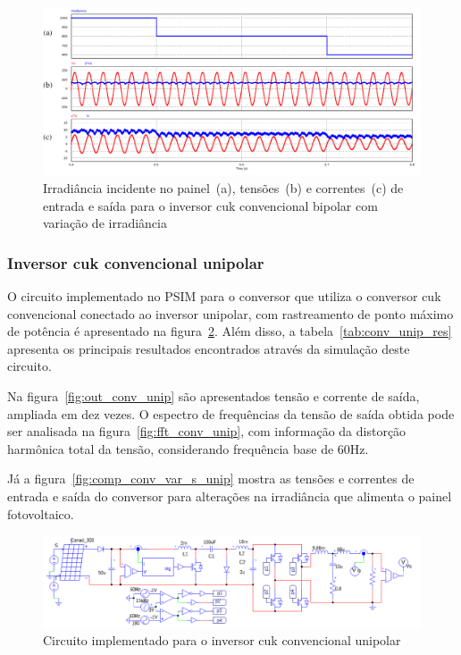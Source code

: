 \documentclass[
	12pt,				%
	openright,			%
	twoside,			%
	a4paper,			%
	english,			%
	french,				%
	spanish,			%
	brazil,				%
	]{abntex2}
\begin{document}
\begin{figure}[H]%
	\captionsetup{justification=centering}
	\centering
		\includegraphics[width= \linewidth]{comp_conv_var_s}
		\caption{Irradiância incidente no painel~(a), tensões~(b) e correntes~(c) de entrada e saída para o inversor cuk convencional bipolar com variação de irradiância}
		\label{fig:comp_conv_var_s_bip}
\end{figure}

\subsubsection{Inversor cuk convencional unipolar}

O circuito implementado no PSIM para o conversor que utiliza o conversor cuk convencional conectado ao inversor unipolar, com rastreamento de ponto máximo de potência é apresentado na figura~\ref{fig:comp_conv_circ_clean_unip}. Além disso, a tabela~\ref{tab:conv_unip_res} apresenta os principais resultados encontrados através da simulação deste circuito.

Na figura~\ref{fig:out_conv_unip} são apresentados tensão e corrente de saída, ampliada em dez vezes. O espectro de frequências da tensão de saída obtida pode ser analisada na figura~\ref{fig:fft_conv_unip},  com informação da distorção harmônica total da tensão, considerando frequência base de 60Hz.


Já a figura~\ref{fig:comp_conv_var_s_unip} mostra as tensões e correntes de entrada e saída do conversor para alterações na irradiância que alimenta o painel fotovoltaico.

\begin{figure}[H]%
	\captionsetup{justification=centering}
	\centering
		\includegraphics[width= \linewidth]{comp_conv_circ_clean_unip}
		\caption{Circuito implementado para o inversor cuk convencional unipolar}
		\label{fig:comp_conv_circ_clean_unip}
\end{figure}
\end{document}

